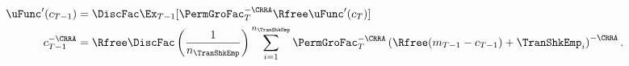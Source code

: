   \begin{equation}\begin{gathered}\begin{aligned}
        \uFunc^{\prime}({c}_{T-1})       & = \DiscFac \Ex_{T-1} [\PermGroFac_{T}^{-\CRRA}\Rfree \uFunc^{\prime}({c}_{T})]  %
        \\      {c}_{T-1}^{-\CRRA}   & = \Rfree \DiscFac \left(\frac{1}{n_{\TranShkEmp}}\right) \sum_{i=1}^{n_{\TranShkEmp}} \PermGroFac_{T}^{-\CRRA}\left(\Rfree ({m}_{T-1}-{c}_{T-1}) + \TranShkEmp_{i}\right)^{-\CRRA} \label{eq:FOCTm1}.
      \end{aligned}\end{gathered}\end{equation}
